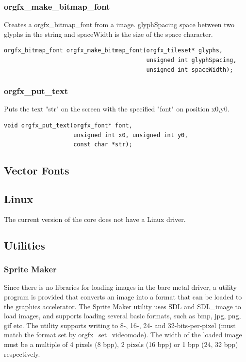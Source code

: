 \documentclass[10pt,a4paper]{article}
\begin{document}
\subsubsection{orgfx\_make\_bitmap\_font}
Creates a orgfx\_bitmap\_font from a image. glyphSpacing space between two glyphs in the string and spaceWidth is the size of the space character.
\begin{lstlisting}
orgfx_bitmap_font orgfx_make_bitmap_font(orgfx_tileset* glyphs,
                                         unsigned int glyphSpacing,
                                         unsigned int spaceWidth);
\end{lstlisting}

\subsubsection{orgfx\_put\_text}
Puts the text "str" on the screen with the specified "font" on position x0,y0.
\begin{lstlisting}
void orgfx_put_text(orgfx_font* font,
                    unsigned int x0, unsigned int y0,
                    const char *str);
\end{lstlisting}

\subsection{Vector Fonts}

\subsection{Linux}
The current version of the core does not have a Linux driver.

\subsection{Utilities}
\subsubsection{Sprite Maker}
Since there is no libraries for loading images in the bare metal driver, a utility program is provided that converts an image into a format that can be loaded to the graphics accelerator. The Sprite Maker utility uses SDL and SDL\_image to load images, and supports loading several basic formats, such as bmp, jpg, png, gif etc. The utility supports writing to 8-, 16-, 24- and 32-bits-per-pixel (must match the format set by orgfx\_set\_videomode). The width of the loaded image must be a multiple of 4 pixels (8 bpp), 2 pixels (16 bpp) or 1 bpp (24, 32 bpp) respectively.
\end{document}
